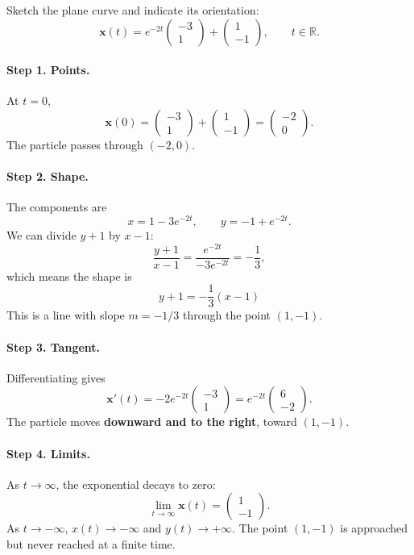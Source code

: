\documentclass[11pt,letterpaper]{article}
\begin{document}
\begin{example}[5]{
Sketch the plane curve and indicate its orientation:
\[
\mathbf{x}(t)=e^{-2t}
\begin{pmatrix}-3\\1\end{pmatrix}
+\begin{pmatrix}1\\-1\end{pmatrix},
\qquad t\in\mathbb R.
\]
}

\paragraph{Step 1. Points.}
At $t=0$,
\[
\mathbf{x}(0)=
\begin{pmatrix}-3\\1\end{pmatrix}
+\begin{pmatrix}1\\-1\end{pmatrix}
=
\begin{pmatrix}-2\\0\end{pmatrix}.
\]
The particle passes through $(-2,0)$.

\paragraph{Step 2. Shape.}
The components are
\[
x=1-3e^{-2t},
\qquad
y=-1+e^{-2t}.
\]
We can divide $y+1$ by $x-1$: 
\[
\frac{y+1}{x-1}=\frac{e^{-2t}}{-3e^{-2t}}=-\frac{1}{3},
\]
which means the shape is
\[
\boxed{y+1=-\frac13(x-1)}
\]
This is a line with slope $m=-1/3$ through the point $(1,-1)$.

\paragraph{Step 3. Tangent.}
Differentiating gives
\[
\mathbf{x}'(t)
=-2e^{-2t}\begin{pmatrix}-3\\1\end{pmatrix}
=e^{-2t}\begin{pmatrix}6\\-2\end{pmatrix}.
\]
The particle moves \textbf{downward and to the right},
toward $(1,-1)$.

\paragraph{Step 4. Limits.}
As $t\to\infty$, the exponential decays to zero:
\[
\lim_{t\to\infty}\mathbf{x}(t)
=\begin{pmatrix}1\\-1\end{pmatrix}.
\]
As $t\to-\infty$, $x(t)\to-\infty$ and
$y(t)\to+\infty$.
The point $(1,-1)$ is approached but never reached
at a finite time.


\end{example}
\end{document}
